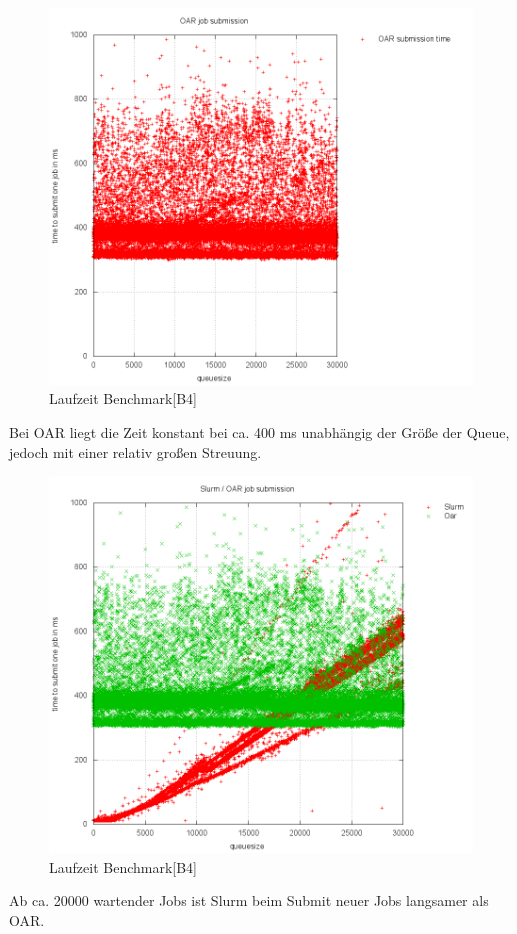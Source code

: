 	\begin{figure}[H]
		\centering
		\includegraphics[scale=0.8]{../oar/output/pics/oar.png} 
		\caption{Laufzeit Benchmark[B4]}
	\end{figure}
    Bei OAR liegt die Zeit konstant bei ca. 400 ms unabhängig der Größe
    der Queue, jedoch mit einer relativ großen Streuung.
    \newpage 

	\begin{figure}[H]
		\centering
		\includegraphics[scale=0.75]{../oar/output/pics/oar_slurm.png} 
		\caption{Laufzeit Benchmark[B4]}
	\end{figure}
    Ab ca. 20000 wartender Jobs ist Slurm beim Submit neuer Jobs langsamer als 
    OAR. 
    \newpage 

